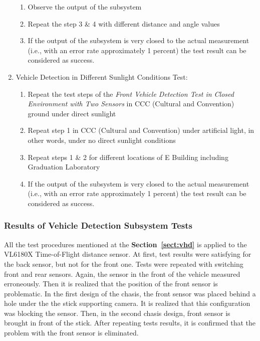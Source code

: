 \documentclass[a4paper,12pt]{article}
\begin{document}
\begin{enumerate}
\begin{enumerate}
		\item Observe the output of the subsystem  
		
		\item Repeat the step 3 \& 4 with different distance and angle values  
		
		\item If the output of the subsystem is very closed to the actual measurement (i.e., with an error rate approximately 1 percent) the test result can be considered as success. 
		
	\end{enumerate}
	
	
	\item Vehicle Detection in Different Sunlight Conditions Test:
	
	\begin{enumerate}
		
		\item Repeat the test steps of the \textit{Front Vehicle Detection Test in Closed Environment with Two Sensors}  in CCC (Cultural and Convention) ground under direct sunlight  
		
		\item Repeat step 1 in CCC (Cultural and Convention) under artificial light, in other words, under no direct sunlight conditions  
		
		\item Repeat steps 1 \& 2 for different locations of E Building including Graduation Laboratory  
		
		\item If the output of the subsystem is very closed to the actual measurement (i.e., with an error rate approximately 1 percent) the test result can be considered as success. 
		
	\end{enumerate}
	
	
	
\end{enumerate}
	
	\subsubsection*{Results of Vehicle Detection Subsystem Tests}
	
	
	All the test procedures mentioned at the \textbf{Section~\ref{sect:vhd}} is applied to the VL6180X Time-of-Flight distance sensor. At first, test results were satisfying for the back sensor, but not for the front one. Tests were repeated with switching front and rear sensors. Again, the sensor in the front of the vehicle measured erroneously. Then it is realized that the position of the front sensor is problematic. In the first design of the chasis, the front sensor was placed behind a hole under the the stick supporting camera. It is realized that this configuration was blocking the sensor. Then, in the second chasis design, front sensor is brought in front of the stick. After repeating tests results, it is confirmed that the problem with the front sensor is eliminated. 
	
\end{document}
